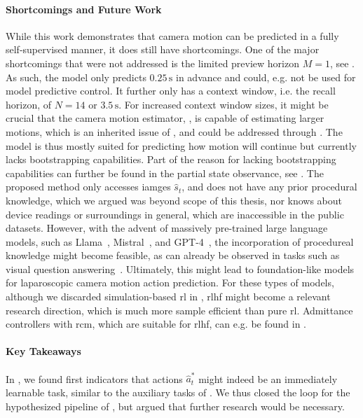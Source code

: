 \paragraph{Shortcomings and Future Work}
While this work demonstrates that camera motion can be predicted in a fully self-supervised manner, it does still have shortcomings. One of the major shortcomings that were not addressed is the limited preview horizon $M=1$, see . As such, the model only predicts $0.25\,\text{s}$ in advance and could, e.g. not be used for model predictive control. It further only has a context window, i.e. the recall horizon, of $N=14$ or $3.5\,\text{s}$. For increased context window sizes, it might be crucial that the camera motion estimator, , is capable of estimating larger motions, which is an inherited issue of , and could be addressed through . The model is thus mostly suited for predicting how motion will continue but currently lacks bootstrapping capabilities. Part of the reason for lacking bootstrapping capabilities can further be found in the partial state observance, see . The proposed method only accesses iamges $\hat{s}_t$, and does not have any prior procedural knowledge, which we argued was beyond scope of this thesis, nor knows about device readings or surroundings in general, which are inaccessible in the public datasets. However, with the advent of massively pre-trained large language models, such as Llama~\cite{touvron2023llama}, Mistral~\cite{jiang2023mistral}, and GPT-4~\cite{achiam2023gpt}, the incorporation of procedureal knowledge might become feasible, as can already be observed in tasks such as visual question answering~\cite{seenivasan2022surgical}. Ultimately, this might lead to foundation-like models for laparoscopic camera motion action prediction. For these types of models, although we discarded simulation-based \gls{rl} in , \gls{rlhf} might become a relevant research direction, which is much more sample efficient than pure \gls{rl}. Admittance controllers with \gls{rcm}, which are suitable for \gls{rlhf}, can e.g. be found in .

\paragraph{Key Takeaways}
In , we found first indicators that actions $\hat{a}^*_t$ might indeed be an immediately learnable task, similar to the auxiliary tasks of . We thus closed the loop for the hypothesized pipeline of , but argued that further research would be necessary.

